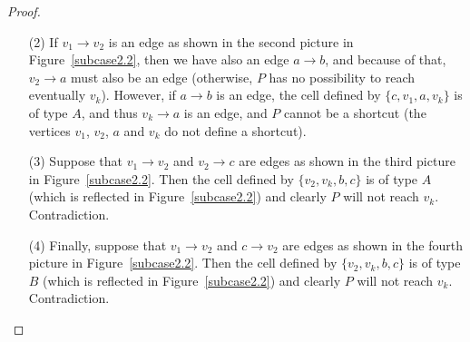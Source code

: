 \documentclass[12pt]{article}
\numberwithin{equation}{section}
\begin{document}
\begin{proof}
\begin{itemize}
\begin{itemize}
  \item[(2)] If $v_1\rightarrow v_2$ is an edge as shown in the second picture in Figure~\ref{subcase2.2}, then we have also an edge $a\rightarrow b$, and because of that, $v_2\rightarrow a$ must also be an edge (otherwise, $P$ has no possibility to reach eventually $v_k$). However, if $a\rightarrow b$ is an edge, the cell defined by $\{c,v_1,a,v_k\}$ is of type $A$, and thus $ v_k\rightarrow a$ is an edge, and $P$ cannot be a shortcut (the vertices $v_1$, $v_2$, $a$ and $v_k$ do not define a shortcut).

  \item[(3)] Suppose that $v_1\rightarrow v_2$ and $v_2\rightarrow c$ are edges as shown in the third picture in Figure~\ref{subcase2.2}. Then the cell defined by $\{v_2,v_k,b,c\}$ is of type $A$ (which is reflected in Figure~\ref{subcase2.2}) and clearly $P$ will not reach $v_k$. Contradiction.

  \item[(4)] Finally, suppose that $v_1\rightarrow v_2$ and $c\rightarrow v_2$ are edges as shown in the fourth picture in Figure~\ref{subcase2.2}. Then the cell defined by $\{v_2,v_k,b,c\}$ is of type $B$ (which is reflected in Figure~\ref{subcase2.2}) and clearly $P$ will not reach $v_k$. Contradiction.

  \end{itemize}
  \begin{figure}[!htbp]
\begin{center}
\end{center}
\end{figure}
\end{itemize}
\end{proof}
\end{document}
